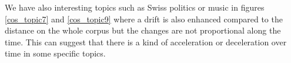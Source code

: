 We have also interesting topics such as Swiss politics or music in figures \ref{cos_topic7} and \ref{cos_topic9} where a drift is also enhanced compared to the distance on the whole corpus but the changes are not proportional along the time. This can suggest that there is a kind of acceleration or deceleration over time in some specific topics.